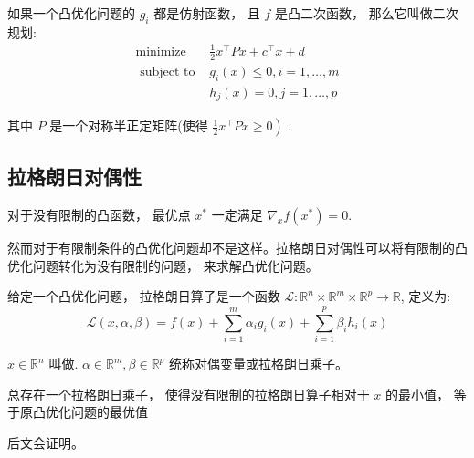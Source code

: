 \begin{definition}[二次规划]
    如果一个凸优化问题的 $ g_{i} $ 都是仿射函数， 且 $ f $ 是凸二次函数， 那么它叫做二次规划:
    \begin{equation}
    \begin{array}{ll}
    \operatorname{minimize} & \frac{1}{2} x^{\top} P x+c^{\top} x+d \\
    \text { subject to } & g_{i}(x) \leqslant 0, i=1, \ldots, m \\
    & h_{j}(x)=0, j=1, \ldots, p
    \end{array}
    \end{equation}

    其中 $ P $ 是一个对称半正定矩阵(使得 $ \left.\frac{1}{2} x^{\top} P x \geqslant 0\right) $ .
\end{definition}



\subsection{拉格朗日对偶性}

\begin{theorem}
    对于没有限制的凸函数， 最优点 $ x^{*} $ 一定满足 $ \nabla_{x} f\left(x^{*}\right)=0 $.
\end{theorem}

然而对于有限制条件的凸优化问题却不是这样。拉格朗日对偶性可以将有限制的凸优化问题转化为没有限制的问题， 来求解凸优化问题。

\begin{definition}[拉格朗日函数]
    给定一个凸优化问题， 拉格朗日算子是一个函数 $ \mathcal{L}: \mathbb{R}^{n} \times \mathbb{R}^{m} \times \mathbb{R}^{p} \rightarrow \mathbb{R} $, 定义为:
    \begin{equation}
    \mathcal{L}(x, \alpha, \beta)=f(x)+\sum_{i=1}^{m} \alpha_{i} g_{i}(x)+\sum_{i=1}^{p} \beta_{i} h_{i}(x)
    \end{equation}

    $ x \in \mathbb{R}^{n} $ 叫做. $ \alpha \in \mathbb{R}^{m}, \beta \in \mathbb{R}^{p} $ 统称对偶变量或拉格朗日乘子。
\end{definition}

\begin{theorem}
    总存在一个拉格朗日乘子， 使得没有限制的拉格朗日算子相对于 $ x $ 的最小值， 等于原凸优化问题的最优值
\end{theorem}

后文会证明。

